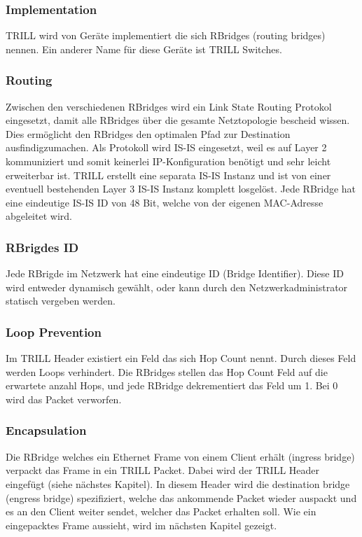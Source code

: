 \documentclass[a4,12pt]{scrartcl}
\begin{document}
\subsubsection{Implementation}
TRILL wird von  Geräte implementiert die sich RBridges (routing bridges) nennen. Ein anderer Name für diese Geräte ist TRILL Switches. 

\subsubsection{Routing}
Zwischen den verschiedenen RBridges wird ein Link State Routing Protokol eingesetzt, damit alle RBridges über die gesamte Netztopologie bescheid wissen. Dies ermöglicht den RBridges den optimalen Pfad zur Destination ausfindigzumachen. Als Protokoll wird IS-IS eingesetzt, weil es auf Layer 2 kommuniziert und somit keinerlei IP-Konfiguration benötigt und sehr leicht erweiterbar ist. TRILL erstellt eine separata IS-IS Instanz und ist von einer eventuell bestehenden Layer 3 IS-IS Instanz komplett losgelöst. Jede RBridge hat eine eindeutige IS-IS ID von 48 Bit, welche von der eigenen MAC-Adresse abgeleitet wird. 

\subsubsection{RBrigdes ID}
Jede RBrigde im Netzwerk hat eine eindeutige ID (Bridge Identifier). Diese ID wird entweder dynamisch gewählt, oder kann durch den Netzwerkadministrator statisch vergeben werden. 

\subsubsection{Loop Prevention}
Im TRILL Header existiert ein Feld das sich Hop Count nennt. Durch dieses Feld werden Loops verhindert. Die RBridges stellen das Hop Count Feld auf die erwartete anzahl Hops, und jede RBridge dekrementiert das Feld um 1. Bei 0 wird das Packet verworfen.  

\subsubsection{Encapsulation}
Die RBridge welches ein Ethernet Frame von einem Client erhält (ingress bridge) verpackt das Frame in ein TRILL Packet. Dabei wird der TRILL Header eingefügt (siehe nächstes Kapitel). In diesem Header wird die destination bridge (engress bridge) spezifiziert, welche das ankommende Packet wieder auspackt und es an den Client weiter sendet, welcher das Packet erhalten soll. Wie ein eingepacktes Frame aussieht, wird im nächsten Kapitel gezeigt. 
\end{document}
